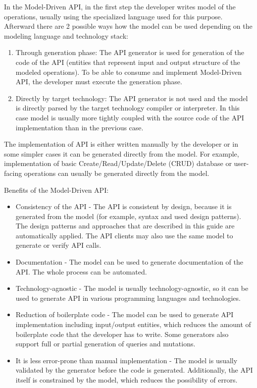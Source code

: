 In the Model-Driven API, in the first step the developer writes model of the operations, usually using the
specialized language used for this purpose.
Afterward there are 2 possible ways how the model can be used depending on the modeling language and technology stack:

\begin{enumerate}
    \item Through generation phase: The API generator is used for generation of the code of the API\@
    (entities that represent input and output structure of the modeled operations).
    To be able to consume and implement Model-Driven API, the developer must execute the generation phase.
    \item Directly by target technology: The API generator is not used and the model is directly parsed
    by the target technology compiler or interpreter.
    In this case model is usually more tightly coupled with the source code of the API implementation
    than in the previous case.
\end{enumerate}

The implementation of API is either written manually by the developer or in some simpler cases it can be generated
directly from the model.
For example, implementation of basic Create/Read/Update/Delete (CRUD) database or user-facing operations can usually
be generated directly from the model.

Benefits of the Model-Driven API:

\begin{itemize}
    \item Consistency of the API - The API is consistent by design, because it is generated from the model
    (for example, syntax and used design patterns).
    The design patterns and approaches that are described in this guide are automatically applied.
    The API clients may also use the same model to generate or verify API calls.
    \item Documentation - The model can be used to generate documentation of the API\@.
    The whole process can be automated.
    \item Technology-agnostic - The model is usually technology-agnostic, so it can be used to generate API
    in various programming languages and technologies.
    \item Reduction of boilerplate code - The model can be used to generate API implementation including
    input/output entities, which reduces the amount of boilerplate code that the developer has to write.
    Some generators also support full or partial generation of queries and mutations.
    \item It is less error-prone than manual implementation - The model is usually validated by the generator
    before the code is generated.
    Additionally, the API itself is constrained by the model, which reduces the possibility of errors.
\end{itemize}

